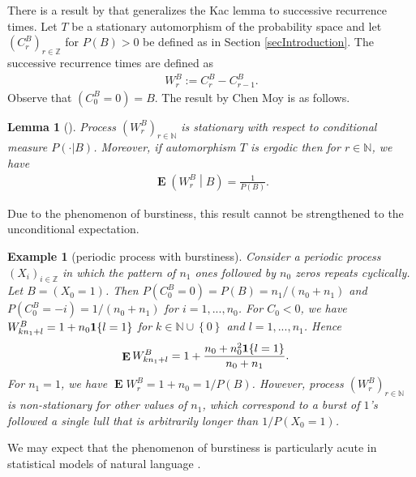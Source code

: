 \documentclass[a4paper,12pt]{article}
\newcommand{\okra}[1]{\left( #1 \right)}
\newcommand{\klam}[1]{\left\{ #1 \right\}}
\DeclareMathOperator{\mean}{\mathbf{E}}
\newcommand{\boole}[1]{{\bf 1}{\klam{#1}}}
\newtheorem{example}{Example}
\newtheorem{lemma}{Lemma}
\begin{document}
There is a result by \citeauthor{ChenMoy59} that generalizes the Kac
lemma to successive recurrence times. Let $T$ be a stationary
automorphism of the probability space and let
$(C^B_r)_{r\in\mathbb{Z}}$ for $P(B)>0$ be defined as in Section
\ref{secIntroduction}.
The successive recurrence times are defined as
\begin{align}
  \label{Successive}
  W^B_r:=C^B_r-C^B_{r-1}.
\end{align}
Observe that $(C^B_0=0)=B$. The result by Chen Moy is as follows.
\begin{lemma}[\citep{ChenMoy59}]
  \label{theoChenMoy}
  Process $(W^B_r)_{r\in\mathbb{N}}$ is stationary with respect to
  conditional measure $P(\cdot|B)$. Moreover, if automorphism $T$
  is ergodic then for $r\in\mathbb{N}$, we have
  \begin{align}
    \mean\okra{W^B_r\middle|B}
    =
    \frac{1}{P(B)}.
  \end{align}
\end{lemma}

Due to the phenomenon of burstiness, this result cannot be
strengthened to the unconditional expectation.
\begin{example}[periodic process with burstiness]
  Consider a periodic process $(X_i)_{i\in\mathbb{Z}}$ in which the
  pattern of $n_1$ ones followed by $n_0$ zeros repeats
  cyclically. Let $B=(X_0=1)$. Then $P(C^B_0=0)=P(B)=n_1/(n_0+n_1)$
  and $P(C^B_0=-i)=1/(n_0+n_1)$ for $i=1,...,n_0$. For $C_0<0$, we
  have $W^B_{kn_1+l}=1+n_0\boole{l=1}$ for
  $k\in\mathbb{N}\cup\klam{0}$ and $l=1,...,n_1$. Hence
\begin{align}
  \mean W^B_{kn_1+l}&=1+\frac{n_0+n_0^2\boole{l=1}}{n_0+n_1}.
\end{align}
For $n_1=1$, we have $\mean W^B_r=1+n_0=1/P(B)$. However, process
$(W^B_r)_{r\in\mathbb{N}}$ is non-stationary for other values of
$n_1$, which correspond to a burst of $1$'s followed a single lull
that is arbitrarily longer than $1/P(X_0=1)$.
\end{example}
We may expect that the phenomenon of burstiness is particularly acute
in statistical models of natural language
\citep{AltmannPierrehumbertMotter09}.
\end{document}
